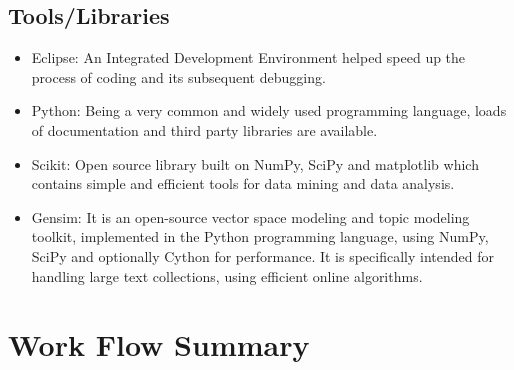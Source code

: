 		\subsection{Tools/Libraries}
\begin{itemize}
	\item Eclipse: An Integrated Development Environment helped speed up the process of coding and its subsequent debugging.
	\item Python: Being a very common and widely used programming language, loads of  documentation and third party libraries are available.
	\item Scikit: Open source library built on NumPy, SciPy and matplotlib which contains simple and efficient tools for data mining and data analysis.
	\item Gensim: It is an open-source vector space modeling and topic modeling toolkit, implemented in the Python programming language, using NumPy, SciPy and optionally Cython for performance. It is specifically intended for handling large text collections, using efficient online algorithms.
\end{itemize}

\section{Work Flow Summary}
			
